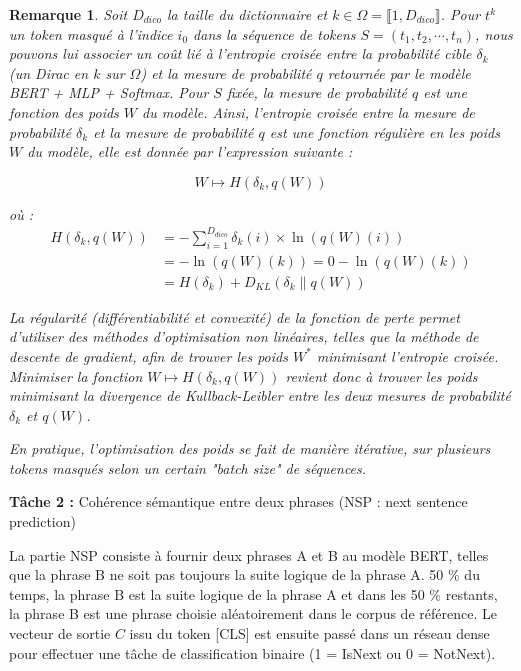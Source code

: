 \documentclass[12pt]{article}
\newtheorem{rmq}{Remarque}
\theoremstyle{definition}
\begin{document}
\begin{rmq}
	Soit $D_{dico}$ la taille du dictionnaire et $k \in \Omega = \llbracket1,D_{dico}\rrbracket$. Pour $t^k$ un token masqué à l'indice $i_0$ dans la séquence de tokens $S = (t_1, t_2, \cdots, t_n)$, nous pouvons lui associer un coût lié à l’entropie croisée entre la probabilité cible $\delta_k$ (un Dirac en $k$ sur $\Omega$) et la mesure de probabilité $q$ retournée par le modèle BERT + MLP + Softmax. Pour $S$ fixée, la mesure de probabilité $q$ est une fonction des poids $W$ du modèle. Ainsi, l’entropie croisée entre la mesure de probabilité $\delta_k$ et la mesure de probabilité $q$ est une fonction régulière en les poids $W$ du modèle, elle est donnée par l'expression suivante :
	
	$$W \longmapsto H(\delta_k, q(W))$$
	
	où :
	\begin{align*}
		H(\delta_k, q(W)) &= - \sum_{i=1}^{D_{dico}} \delta_k(i) \times \ln(q(W)(i))\\
		&= -\ln(q(W)(k)) = 0 -\ln(q(W)(k))  \\
		&= H(\delta_k) + D_{KL}\left(\delta_k \| q(W)\right)
	\end{align*}
	
	La régularité (différentiabilité et convexité) de la fonction de perte permet d’utiliser des méthodes d’optimisation non linéaires, telles que la méthode de descente de gradient, afin de trouver les poids $W^*$ minimisant l'entropie croisée. Minimiser la fonction $W \mapsto H(\delta_k, q(W))$ revient donc à trouver les poids minimisant la divergence de Kullback-Leibler entre les deux mesures de probabilité $\delta_k$ et $q(W)$. 
	
	En pratique, l'optimisation des poids se fait de manière itérative, sur plusieurs tokens masqués selon un certain "batch size" de séquences.
\end{rmq}

\textbf{Tâche 2 :} Cohérence sémantique entre deux phrases (NSP : next sentence prediction)

La partie NSP consiste à fournir deux phrases A et B au modèle BERT, telles que la phrase B ne soit pas toujours la suite logique de la phrase A. 50 \% du temps, la phrase B est la suite logique de la phrase A et dans les 50 \% restants, la phrase B est une phrase choisie aléatoirement dans le corpus de référence. Le vecteur de sortie $C$ issu du token [CLS] est ensuite passé dans un réseau dense pour effectuer une tâche de classification binaire (1 = IsNext ou 0 = NotNext).
\end{document}
